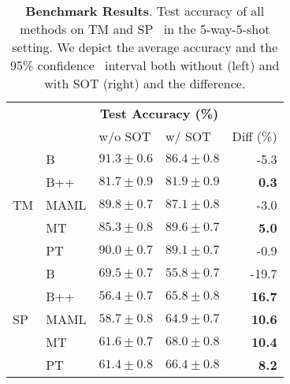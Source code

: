\begin{table}[h]
\caption{\textbf{Benchmark Results}. Test accuracy of all methods on TM and SP     \ in the 5-way-5-shot setting. We depict the average accuracy and the 95\% confidence      \ interval both without (left) and with SOT (right) and the difference.}
\label{tab:tuned-benchmark}
\centering
\begin{tabular}{llllr}
\toprule
& & \multicolumn{2}{c}{\textbf{Test Accuracy (\%)}} &  \\
 &  & w/o SOT & w/ SOT & Diff (\%) \\
\midrule
\multirow[c]{5}{*}{TM} & B & $\mathbf{91.3 \pm 0.6}$ & $86.4 \pm 0.8$ & \color{red} -5.3 \\
 & B++ & $81.7 \pm 0.9$ & $81.9 \pm 0.9$ & \bfseries \color{teal} 0.3 \\
 & MAML & $89.8 \pm 0.7$ & $87.1 \pm 0.8$ & \color{red} -3.0 \\
 & MT & $85.3 \pm 0.8$ & $\mathbf{89.6 \pm 0.7}$ & \bfseries \color{teal} 5.0 \\
 & PT & $90.0 \pm 0.7$ & $89.1 \pm 0.7$ & \color{red} -0.9 \\
\midrule
\multirow[c]{5}{*}{SP} & B & $\mathbf{69.5 \pm 0.7}$ & $55.8 \pm 0.7$ & \color{red} -19.7 \\
 & B++ & $56.4 \pm 0.7$ & $65.8 \pm 0.8$ & \bfseries \color{teal} 16.7 \\
 & MAML & $58.7 \pm 0.8$ & $64.9 \pm 0.7$ & \bfseries \color{teal} 10.6 \\
 & MT & $61.6 \pm 0.7$ & $\mathbf{68.0 \pm 0.8}$ & \bfseries \color{teal} 10.4 \\
 & PT & $61.4 \pm 0.8$ & $66.4 \pm 0.8$ & \bfseries \color{teal} 8.2 \\
\bottomrule
\end{tabular}
\end{table}